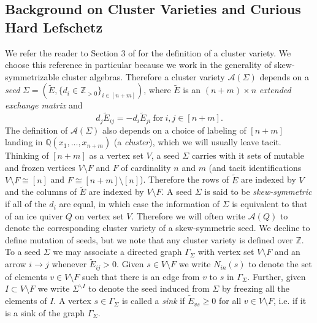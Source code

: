 \documentclass[11pt]{amsart}
\theoremstyle{definition}
\theoremstyle{remark}
\numberwithin{equation}{section}
\begin{document}
\subsection{Background on Cluster Varieties and Curious Hard Lefschetz}\label{subsection 4.1}

We refer the reader to Section 3 of \cite{galashin2026braid} for the definition of a cluster variety. We choose this reference in particular because we work in the generality of skew-symmetrizable cluster algebras. Therefore a cluster variety $\mathcal{A}(\Sigma)$ depends on a \textit{seed} $\Sigma = (\tilde{E}, \{d_i \in \mathbb{Z}_{>0}\}_{i \in [n + m]})$, where $\tilde{E}$ is an $(n + m) \times n$ \textit{extended exchange matrix} and \begin{equation}
    d_j \tilde{E}_{ij} = -d_i \tilde{E}_{ji} \:\text{for}\: i,j \in [n + m].
\end{equation} The definition of $\mathcal{A}(\Sigma)$ also depends on a choice of labeling of $[n + m]$ landing in $\mathbb{Q}(x_1, ..., x_{n+m})$ (a \textit{cluster}), which we will usually leave tacit.\\

Thinking of $[n +m]$ as a vertex set $V$, a seed $\Sigma$ carries with it sets of mutable and frozen vertices $V \setminus F$ and $F$ of cardinality $n$ and $m$ (and tacit identifications $V \setminus F \cong [n]$ and $F \cong [n+m]\setminus[n]$). Therefore the rows of $\tilde{E}$ are indexed by $V$ and the columns of $\tilde{E}$ are indexed by $V \setminus F$. A seed $\Sigma$ is said to be \textit{skew-symmetric} if all of the $d_i$ are equal, in which case the information of $\Sigma$ is equivalent to that of an ice quiver $Q$ on vertex set $V$. Therefore we will often write $\mathcal{A}(Q)$ to denote the corresponding cluster variety of a skew-symmetric seed. We decline to define mutation of seeds, but we note that any cluster variety is defined over $\mathbb{Z}$.\\

To a seed $\Sigma$ we may associate a directed graph $\Gamma_\Sigma$ with vertex set $V \setminus F$ and an arrow $i \rightarrow j$ whenever $\tilde{E}_{ij} > 0$. Given $s \in V \setminus F$ we write $N_{in}(s)$ to denote the set of elements $v \in V \setminus F$ such that there is an edge from $v$ to $s$ in $\Gamma_\Sigma$. Further, given $I \subset V \setminus F$ we write $\Sigma^{\backslash I}$ to denote the seed induced from $\Sigma$  by freezing all the elements of $I$. A vertex $s \in \Gamma_\Sigma$ is called a \textit{sink} if $\tilde{E}_{vs} \geq 0$ for all $v \in V \setminus F$, i.e. if it is a sink of the graph $\Gamma_\Sigma$.\\
\end{document}
